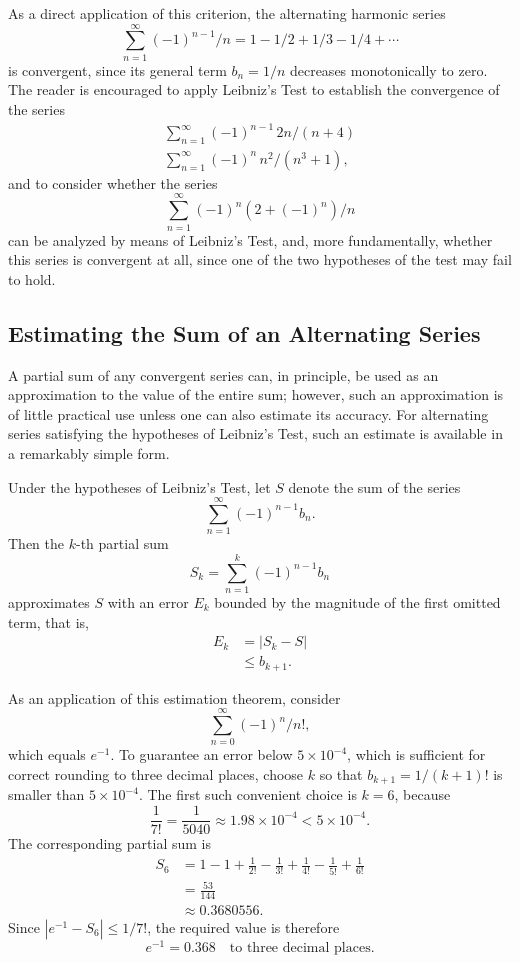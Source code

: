 As a direct application of this criterion, the alternating harmonic series \[
\sum_{n=1}^{\infty} (-1)^{n-1} / n = 1 - 1/2 + 1/3 - 1/4 + \cdots
\] is convergent, since its general term $b_n = 1/n$ decreases monotonically to zero. The reader is encouraged to apply Leibniz's Test to establish the convergence of the series
\[
\begin{gathered}
\sum_{n=1}^{\infty} (-1)^{n-1} \, 2n/(n+4) \\
\sum_{n=1}^{\infty} (-1)^n \, n^2/(n^3+1),
\end{gathered}
\]
and to consider whether the series
\[
\sum_{n=1}^{\infty} (-1)^n (2 + (-1)^n)/n
\]
can be analyzed by means of Leibniz's Test, and, more fundamentally, whether this series is convergent at all, since one of the two hypotheses of the test may fail to hold.

\subsection{Estimating the Sum of an Alternating Series}

A partial sum of any convergent series can, in principle, be used as an approximation to the value of the entire sum; however, such an approximation is of little practical use unless one can also estimate its accuracy. For alternating series satisfying the hypotheses of Leibniz's Test, such an estimate is available in a remarkably simple form.

\begin{theorem}
Under the hypotheses of Leibniz's Test, let $S$ denote the sum of the series
\[
\sum_{n=1}^{\infty} (-1)^{n-1} b_n.
\]
Then the $k$-th partial sum \[
S_k = \sum_{n=1}^{k} (-1)^{n-1} b_n
\] approximates $S$ with an error $E_k$ bounded by the magnitude of the first omitted term, that is,
\[
\begin{aligned}
E_k &= |S_k - S| \\
&\leq b_{k+1}.
\end{aligned}
\]

\end{theorem}

As an application of this estimation theorem, consider \[
\sum_{n=0}^{\infty} (-1)^n / n!,
\] which equals $e^{-1}$. To guarantee an error below $5\times10^{-4}$,
which is sufficient for correct rounding to three decimal places, choose
$k$ so that $b_{k+1} = 1/(k+1)!$ is smaller than $5\times10^{-4}$. The first such convenient choice is
$k=6$, because
\[
\frac1{7!}=\frac1{5040}\approx1.98\times10^{-4}<5\times10^{-4}.
\]
The corresponding partial sum is
\[
\begin{aligned}
S_6
&=1-1+\frac1{2!}-\frac1{3!}+\frac1{4!}-\frac1{5!}+\frac1{6!}\\
&=\frac{53}{144}\\
&\approx0.3680556.
\end{aligned}
\]
Since $|e^{-1}-S_6|\leq1/7!$, the required value is therefore
\[
e^{-1}=0.368\quad\text{to three decimal places}.
\]


